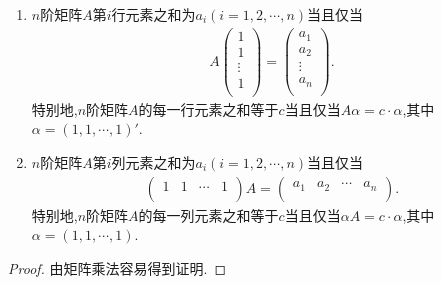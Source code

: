 \documentclass[../../main.tex]{subfiles}%
\begin{document}
\begin{proposition}[矩阵行和和列和的一种刻画]\label{proposition:对矩阵行和和列和的一种刻画}
\begin{enumerate}[(1)]
\item $n$阶矩阵$A$第$i$行元素之和为$a_i(i=1,2,\cdots,n)$当且仅当
\begin{align*}
A\left( \begin{array}{c}
1\\
1\\
\vdots\\
1\\
\end{array} \right) =\left( \begin{array}{c}
a_1\\
a_2\\
\vdots\\
a_n\\
\end{array} \right)
.
\end{align*}
特别地,$n$阶矩阵$A$的每一行元素之和等于$c$当且仅当$A\alpha=c\cdot\alpha$,其中$\alpha=(1,1,\cdots,1)'$.
\item $n$阶矩阵$A$第$i$列元素之和为$a_i(i=1,2,\cdots,n)$当且仅当
\begin{align*}
\left( \begin{matrix}
1&		1&		\cdots&		1\\
\end{matrix} \right) A=\left( \begin{matrix}
a_1&		a_2&		\cdots&		a_n\\
\end{matrix} \right). 
\end{align*}
特别地,$n$阶矩阵$A$的每一列元素之和等于$c$当且仅当$\alpha A=c\cdot\alpha$,其中$\alpha=(1,1,\cdots,1)$.
\end{enumerate}
\end{proposition}
\begin{proof}

由矩阵乘法容易得到证明.

\end{proof}
\end{document}
